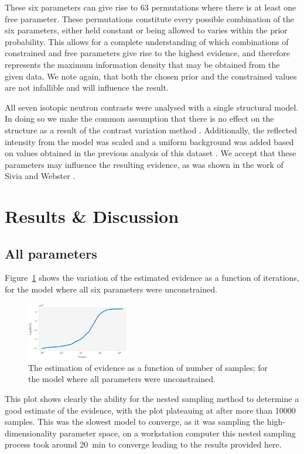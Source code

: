 \documentclass[
 reprint,
 superscriptaddress,
 amsmath,amssymb,
 aps,
]{revtex4-1}
\begin{document}
%
These six parameters can give rise to \num{63} permutations where there is at least one free parameter. 
These permutations constitute every possible combination of the six parameters, either held constant or being allowed to varies within the prior probability. 
This allows for a complete understanding of which combinations of constrained and free parameters give rise to the highest evidence, and therefore represents the maximum information density that may be obtained from the given data.
We note again, that both the chosen prior and the constrained values are not infallible and will influence the result. 

All seven isotopic neutron contrasts were analysed with a single structural model. 
In doing so we make the common assumption that there is no effect on the structure as a result of the contrast variation method \cite{nelson_motofit_2006}. 
Additionally, the reflected intensity from the model was scaled and a uniform background was added based on values obtained in the previous analysis of this dataset \cite{mccluskey_assessing_2019}. 
We accept that these parameters may influence the resulting evidence, as was shown in the work of Sivia and Webster \cite{sivia_bayesian_1998}.

\section{\label{results} Results \& Discussion}

\subsection{All parameters}
Figure~\ref{fig:iterations} shows the variation of the estimated evidence as a function of iterations, for the model where all six parameters were unconstrained.
%
\begin{figure}
\includegraphics[width=0.4\textwidth]{iterations}
\caption{\label{fig:iterations} The estimation of evidence as a function of number of samples; for the model where all parameters were unconstrained.}
\end{figure}
%
This plot shows clearly the ability for the nested sampling method to determine a good estimate of the evidence, with the plot plateauing at \unskip\;after more than \num{10000} samples.
This was the slowest model to converge, as it was sampling the high-dimensionality parameter space, on a workstation computer this nested sampling process took around \SI{20}{\minute} to converge leading to the results provided here.
\end{document}
